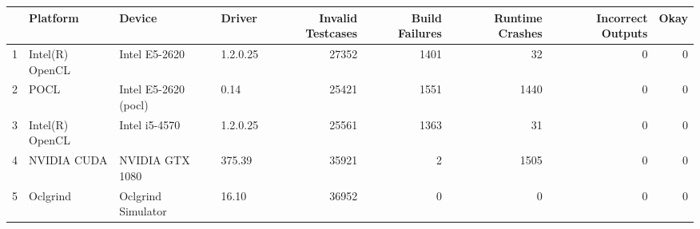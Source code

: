 \begin{tabular}{llllrrrrr}
\toprule
{} &         Platform &                Device &    Driver &  Invalid Testcases &  Build Failures &  Runtime Crashes &  Incorrect Outputs &  Okay \\
\midrule
1 &  Intel(R) OpenCL &         Intel E5-2620 &  1.2.0.25 &              27352 &            1401 &               32 &                  0 &     0 \\
2 &             POCL &  Intel E5-2620 (pocl) &      0.14 &              25421 &            1551 &             1440 &                  0 &     0 \\
3 &  Intel(R) OpenCL &         Intel i5-4570 &  1.2.0.25 &              25561 &            1363 &               31 &                  0 &     0 \\
4 &      NVIDIA CUDA &       NVIDIA GTX 1080 &    375.39 &              35921 &               2 &             1505 &                  0 &     0 \\
5 &         Oclgrind &    Oclgrind Simulator &     16.10 &              36952 &               0 &                0 &                  0 &     0 \\
\bottomrule
\end{tabular}
